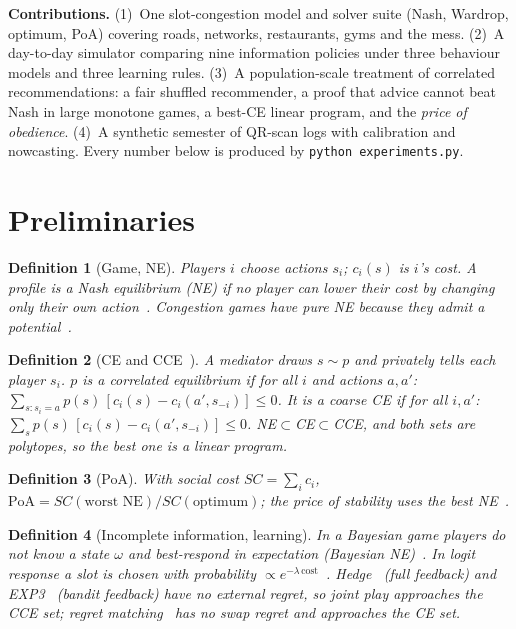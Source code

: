 \documentclass{article}
\newtheorem{definition}{Definition}
\begin{document}
\textbf{Contributions.} (1)~One slot-congestion model and solver suite (Nash, Wardrop, optimum, PoA) covering
roads, networks, restaurants, gyms and the mess. (2)~A day-to-day simulator comparing nine information policies
under three behaviour models and three learning rules. (3)~A population-scale treatment of correlated
recommendations: a fair shuffled recommender, a proof that advice cannot beat Nash in large monotone games, a
best-CE linear program, and the \emph{price of obedience}. (4)~A synthetic semester of QR-scan logs with
calibration and nowcasting. Every number below is produced by \texttt{python experiments.py}.

\section{Preliminaries}
\begin{definition}[Game, NE] Players $i$ choose actions $s_i$; $c_i(s)$ is $i$'s cost. A profile is a
\emph{Nash equilibrium} (NE) if no player can lower their cost by changing only their own action~\cite{nash}.
Congestion games have pure NE because they admit a potential~\cite{rosenthal}.\end{definition}
\begin{definition}[CE and CCE~\cite{aumann}] A mediator draws $s\sim p$ and privately tells each player $s_i$.
$p$ is a \emph{correlated equilibrium} if for all $i$ and actions $a,a'$:
$\sum_{s:s_i=a}p(s)\,[c_i(s)-c_i(a',s_{-i})]\le 0$. It is a \emph{coarse} CE if for all $i,a'$:
$\sum_s p(s)\,[c_i(s)-c_i(a',s_{-i})]\le0$. NE$\subset$CE$\subset$CCE, and both sets are polytopes, so the best
one is a linear program.\end{definition}
\begin{definition}[PoA] With social cost $SC=\sum_i c_i$, $\mathrm{PoA}=SC(\text{worst NE})/SC(\text{optimum})$;
the price of stability uses the best NE~\cite{koutsoupias,roughgarden}.\end{definition}
\begin{definition}[Incomplete information, learning] In a Bayesian game players do not know a state $\omega$ and
best-respond in expectation (Bayesian NE)~\cite{harsanyi}. In logit response a slot is chosen with probability
$\propto e^{-\lambda\,\text{cost}}$~\cite{mckelvey}. Hedge~\cite{freund} (full feedback) and EXP3~\cite{auer}
(bandit feedback) have no external regret, so joint play approaches the CCE set; regret matching~\cite{hart} has
no swap regret and approaches the CE set.\end{definition}
\end{document}
